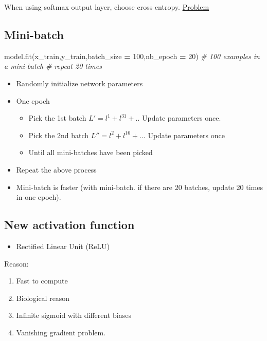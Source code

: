 \documentclass[
]{book}
\newenvironment{Shaded}{\begin{snugshade}}{\end{snugshade}}
\newcommand{\CommentTok}[1]{\textcolor[rgb]{0.56,0.35,0.01}{\textit{#1}}}
\newcommand{\DecValTok}[1]{\textcolor[rgb]{0.00,0.00,0.81}{#1}}
\newcommand{\NormalTok}[1]{#1}
\newcommand{\OperatorTok}[1]{\textcolor[rgb]{0.81,0.36,0.00}{\textbf{#1}}}
\providecommand{\tightlist}{%
  \setlength{\itemsep}{0pt}\setlength{\parskip}{0pt}}
\begin{document}
When using softmax output layer, choose cross entropy. \href{http://proceedings.mlr.press/v9/glorot10a/glorot10a.pdf}{Problem}

\hypertarget{mini-batch}{%
\subsection{Mini-batch}\label{mini-batch}}

\begin{Shaded}
\begin{Highlighting}[]
\NormalTok{model.fit(x\_train,y\_train,batch\_size }\OperatorTok{=} \DecValTok{100}\NormalTok{,nb\_epoch }\OperatorTok{=} \DecValTok{20}\NormalTok{) }\CommentTok{\# 100 examples in a mini{-}batch }
\CommentTok{\# repeat 20 times}
\end{Highlighting}
\end{Shaded}

\begin{itemize}
\item
  Randomly initialize network parameters
\item
  One epoch

  \begin{itemize}
  \tightlist
  \item
    Pick the 1st batch \(L'= l^1 + l^{31} + ..\) Update parameters once.
  \item
    Pick the 2nd batch \(L''=l^2 + l^{16} +...\) Update parameters once
  \item
    Until all mini-batches have been picked
  \end{itemize}
\item
  Repeat the above process
\item
  Mini-batch is faster (with mini-batch. if there are 20 batches, update 20 times in one epoch).
\end{itemize}

\hypertarget{new-activation-function}{%
\subsection{New activation function}\label{new-activation-function}}

\begin{itemize}
\tightlist
\item
  Rectified Linear Unit (ReLU)
\end{itemize}

Reason:

\begin{enumerate}
\def\labelenumi{\arabic{enumi}.}
\tightlist
\item
  Fast to compute
\item
  Biological reason
\item
  Infinite sigmoid with different biases
\item
  Vanishing gradient problem.
\end{enumerate}
\end{document}

